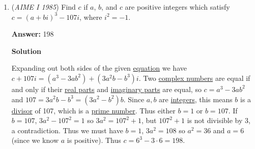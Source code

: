 \begin{enumerate}
\textbf{Solution 3(Ratios)}

Let $a$ and $b$ be the two legs of the equation. We can find $\frac{a}{b}$ by doing $\frac{1920\pi}{800\pi}$. This simplified is $\frac{12}{5}$. We can represent the two legs as $12x$ and $5x$ for $a$ and $b$ respectively. 

 Since the volume of the first cone is $800\pi$, we use the formula for the volume of a cone and get $100\pi x^3=800 \pi$. Solving for $x$, we get $x=2$. 

 Plugging in the side lengths to the Pythagorean Theorem, we get an answer of $\boxed{026}$.

 



\textbf{Solution 4 (Smarter Ratios)}

Continue solution 3 until we obtain, $\frac{x}{y} = \frac{12}{5}$. Let $x = 12$ and $y=5$, and $xy^2 = 300$. This is 8 times off. So, we wish to give a 2 to $x$ and a 4 to $y^2$, meaning that both $x$ and $y$ obtain a factor 2. Thus, $x= 12\cdot 2 = 24$ and $y = 5 \cdot 2 = 10$, and the result is just $\sqrt{676} = \boxed{026}$



	\item (\textit{AIME I 1985}) Find $c$ if $a$, $b$, and $c$ are positive integers which satisfy $c=(a + bi)^3 - 107i$, where $i^2 = -1$.


 
 \textbf{Answer: }198



\textbf{Solution}

Expanding out both sides of the given \href{https://artofproblemsolving.com/wiki/index.php?title=Equation}{equation} we have $c + 107i = (a^3 - 3ab^2) + (3a^2b - b^3)i$.  Two \href{https://artofproblemsolving.com/wiki/index.php?title=Complex\_number}{complex numbers} are equal if and only if their \href{https://artofproblemsolving.com/wiki/index.php?title=Real\_part}{real parts} and \href{https://artofproblemsolving.com/wiki/index.php?title=Imaginary\_part}{imaginary parts} are equal, so $c = a^3 - 3ab^2$ and $107 = 3a^2b - b^3 = (3a^2 - b^2)b$.  Since $a, b$ are \href{https://artofproblemsolving.com/wiki/index.php?title=Integer}{integers}, this means $b$ is a \href{https://artofproblemsolving.com/wiki/index.php?title=Divisor}{divisor} of 107, which is a \href{https://artofproblemsolving.com/wiki/index.php?title=Prime\_number}{prime number}.  Thus either $b = 1$ or $b = 107$.  If $b = 107$, $3a^2 - 107^2 = 1$ so $3a^2 = 107^2 + 1$, but $107^2 + 1$ is not divisible by 3, a contradiction.  Thus we must have $b = 1$, $3a^2 = 108$ so $a^2 = 36$ and $a = 6$ (since we know $a$ is positive).  Thus $c = 6^3 - 3\cdot 6 = \boxed{198}$.


\end{enumerate}
